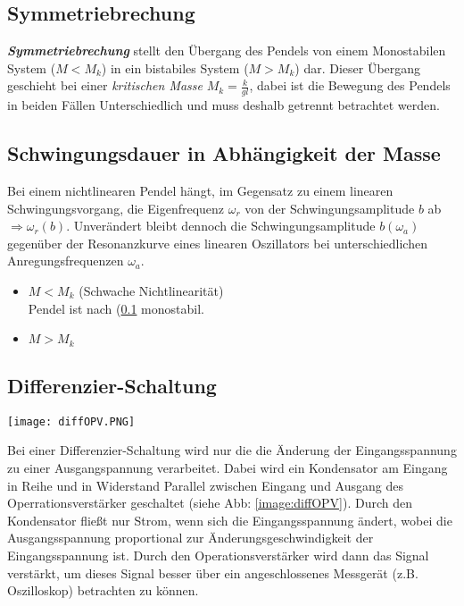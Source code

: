 \subsection{Symmetriebrechung}
\label{sub:symbrechung}
\textit{\textbf{Symmetriebrechung}} stellt den Übergang des Pendels von einem Monostabilen System ($M<M_k$) in ein bistabiles System ($M>M_k$) dar. Dieser Übergang geschieht bei einer \textit{kritischen Masse} $M_k=\frac{k}{gl}$, dabei ist die Bewegung des Pendels in beiden Fällen Unterschiedlich und muss deshalb getrennt betrachtet werden. \citep{Lueck}

\subsection{Schwingungsdauer in Abhängigkeit der Masse}
\label{sub:schwingungsdauer}
Bei einem nichtlinearen Pendel hängt, im Gegensatz zu einem linearen Schwingungsvorgang, die Eigenfrequenz $\omega_r$ von der Schwingungsamplitude $b$ ab $\Rightarrow \omega_r(b)$. Unverändert bleibt dennoch die Schwingungsamplitude $b(\omega_a)$ gegenüber der Resonanzkurve eines linearen Oszillators bei unterschiedlichen Anregungsfrequenzen $\omega_a$. \citep{Lueck}
\begin{itemize}
    \item[1.] $M<M_k$ (Schwache Nichtlinearität)\\
    Pendel ist nach (\ref{sub:symbrechung} monostabil.
    \item[2.] $M>M_k$
\end{itemize}

\subsection{Differenzier-Schaltung}
\label{sub:diffSchaltung}
\begin{center}
    \texttt{[image: diffOPV.PNG]}
    \label{image:diffOPV}
\end{center}
Bei einer Differenzier-Schaltung wird nur die die Änderung der Eingangsspannung zu einer Ausgangspannung verarbeitet. Dabei wird ein Kondensator am Eingang in Reihe und in Widerstand Parallel zwischen Eingang und Ausgang des Operrationsverstärker geschaltet (siehe Abb: \ref{image:diffOPV}). Durch den Kondensator fließt nur Strom, wenn sich die Eingangsspannung ändert, wobei die Ausgangsspannung proportional zur Änderungsgeschwindigkeit der Eingangsspannung ist. Durch den Operationsverstärker wird dann das Signal verstärkt, um dieses Signal besser über ein angeschlossenes Messgerät (z.B. Oszilloskop) betrachten zu können. \citep{electronik}
